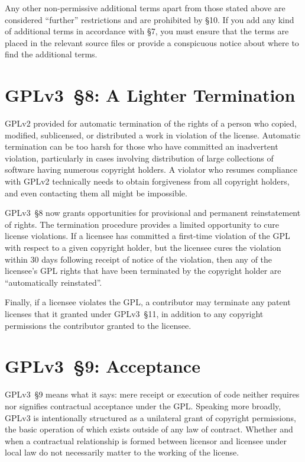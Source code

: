 
Any other non-permissive additional terms apart from those stated above are
considered ``further'' restrictions and are prohibited by \S10. If you add any
kind of additional terms in accordance with \S7, you must ensure that the
terms are placed in the relevant source files or provide a conspicuous notice
about where to find the additional terms.

\section{GPLv3~\S8: A Lighter Termination}

GPLv2 provided for automatic termination of the rights of a person who
copied, modified, sublicensed, or distributed a work in violation of the
license.  Automatic termination can be too harsh for those who have committed
an inadvertent violation, particularly in cases involving distribution of
large collections of software having numerous copyright holders.  A violator
who resumes compliance with GPLv2 technically needs to obtain forgiveness
from all copyright holders, and even contacting them all might be impossible.

GPLv3~\S8 now grants opportunities for provisional and permanent
reinstatement of rights. The termination procedure provides a limited
opportunity to cure license violations.  If a licensee has committed a
first-time violation of the GPL with respect to a given copyright holder, but
the licensee cures the violation within 30 days following receipt of notice
of the violation, then any of the licensee's GPL rights that have been
terminated by the copyright holder are ``automatically reinstated''.


Finally, if a licensee violates the GPL, a contributor may terminate any
patent licenses that it granted under GPLv3~\S11, in addition to any
copyright permissions the contributor granted to the licensee.


\section{GPLv3~\S9: Acceptance}

GPLv3~\S9 means what it says: mere receipt or execution of code neither
requires nor signifies contractual acceptance under the GPL.  Speaking more
broadly, GPLv3 is intentionally structured as a unilateral grant
of copyright permissions, the basic operation of which exists outside of any
law of contract.  Whether and when a contractual relationship is formed
between licensor and licensee under local law do not necessarily matter to
the working of the license.

